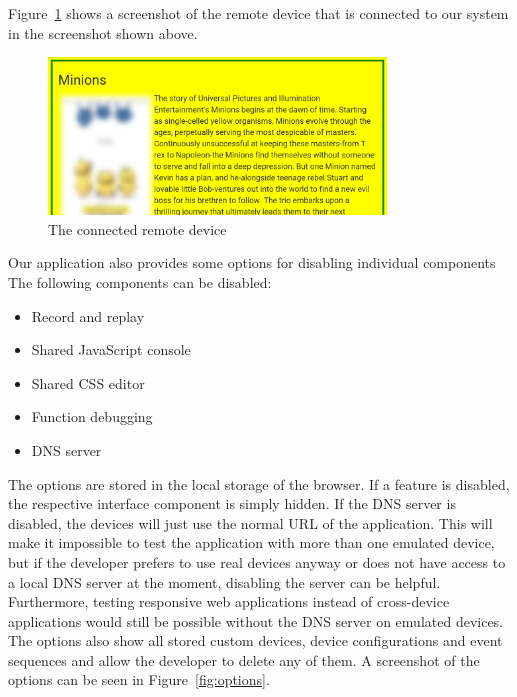 Figure~\ref{fig:complete_remote} shows a screenshot of the remote device that is connected to our system in the screenshot shown above.

\begin{figure}[H]
  \centering
    \includegraphics[width=0.8\textwidth]{images/screenshots/complete_remote_2.png}
	\caption[Screenshot: Remote Device]{The connected remote device}
	\label{fig:complete_remote}
\end{figure}

Our application also provides some options for disabling individual components The following components can be disabled:
\begin{itemize}
	\item Record and replay
	\item Shared JavaScript console
	\item Shared CSS editor
	\item Function debugging
	\item DNS server
\end{itemize}
The options are stored in the local storage of the browser. If a feature is disabled, the respective interface component is simply hidden. If the DNS server is disabled, the devices will just use the normal URL of the application. This will make it impossible to test the application with more than one emulated device, but if the developer prefers to use real devices anyway or does not have access to a local DNS server at the moment, disabling the server can be helpful. Furthermore, testing responsive web applications instead of cross-device applications would still be possible without the DNS server on emulated devices. The options also show all stored custom devices, device configurations and event sequences and allow the developer to delete any of them. A screenshot of the options can be seen in Figure~\ref{fig:options}.

